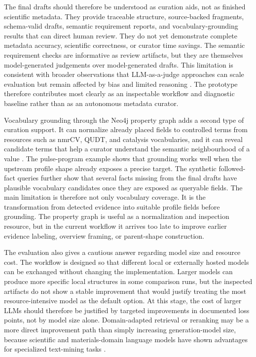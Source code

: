 The final drafts should therefore be understood as curation aids, not as finished scientific metadata.
They provide traceable structure, source-backed fragments, schema-valid drafts, semantic requirement reports, and vocabulary-grounding results that can direct human review.
They do not yet demonstrate complete metadata accuracy, scientific correctness, or curator time savings.
The semantic requirement checks are informative as review artifacts, but they are themselves model-generated judgements over model-generated drafts.
This limitation is consistent with broader observations that \ac{LLM}-as-a-judge approaches can scale evaluation but remain affected by bias and limited reasoning \cite{zheng2023llmjudge}.
The prototype therefore contributes most clearly as an inspectable workflow and diagnostic baseline rather than as an autonomous metadata curator.

Vocabulary grounding through the Neo4j property graph adds a second type of curation support.
It can normalize already placed fields to controlled terms from resources such as \ac{nmrCV}, \ac{QUDT}, and catalysis vocabularies, and it can reveal candidate terms that help a curator understand the semantic neighbourhood of a value \cite{Schober2018nmrML,qudt2022schema,david_linke_2023_8313340}.
The pulse-program example shows that grounding works well when the upstream profile shape already exposes a precise target.
The synthetic followed-fact queries further show that several facts missing from the final drafts have plausible vocabulary candidates once they are exposed as queryable fields.
The main limitation is therefore not only vocabulary coverage.
It is the transformation from detected evidence into suitable profile fields before grounding.
The property graph is useful as a normalization and inspection resource, but in the current workflow it arrives too late to improve earlier evidence labeling, overview framing, or parent-shape construction.

The evaluation also gives a cautious answer regarding model size and resource cost.
The workflow is designed so that different local or externally hosted models can be exchanged without changing the implementation.
Larger models can produce more specific local structures in some comparison runs, but the inspected artifacts do not show a stable improvement that would justify treating the most resource-intensive model as the default option.
At this stage, the cost of larger \acp{LLM} should therefore be justified by targeted improvements in documented loss points, not by model size alone.
Domain-adapted retrieval or reranking may be a more direct improvement path than simply increasing generation-model size, because scientific and materials-domain language models have shown advantages for specialized text-mining tasks \cite{beltagy2019scibert,gupta2022matscibert,zhang2024chemicaltextmining}.

